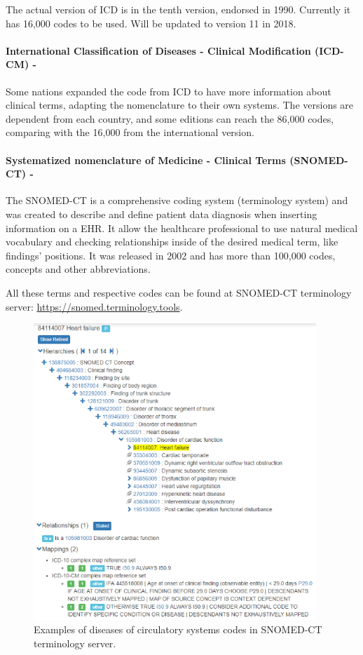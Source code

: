 \documentclass[mim_thesis.tex]{subfiles}
\begin{document}
The actual version of ICD is in the tenth version, endorsed in 1990. Currently it has 16,000 codes to be used. Will be updated to version 11 in 2018. \citep{ICD2018}


\paragraph{\textbf{International Classification of Diseases - Clinical Modification (ICD-CM) -}}
Some nations expanded the code from ICD to have more information about clinical terms, adapting the nomenclature to their own systems. The versions are dependent from each country, and some editions can reach the  86,000 codes, comparing with the 16,000 from the international version. \citep{ICDCM2018}


\paragraph{\textbf{Systematized nomenclature of Medicine - Clinical Terms (SNOMED-CT) -}}
The SNOMED-CT is a comprehensive coding system (terminology system) and was created to describe and define patient data diagnosis when inserting information on a EHR. It allow the healthcare professional to use natural medical vocabulary and checking relationships inside of the desired medical term, like findings’ positions. \citep{SCT2018} It was released in 2002 and has more than 100,000 codes, concepts and other abbreviations. 

All these terms and respective codes can be found at SNOMED-CT terminology server: \url{https://snomed.terminology.tools}.

\begin{figure}[H]
	\centering
    \includegraphics[width=0.95\textwidth]{img/snomed.PNG}
	\caption{Examples of diseases of circulatory systems codes in SNOMED-CT terminology server.}
	\label{fig:snomed_ct}
\end{figure}
\end{document}
